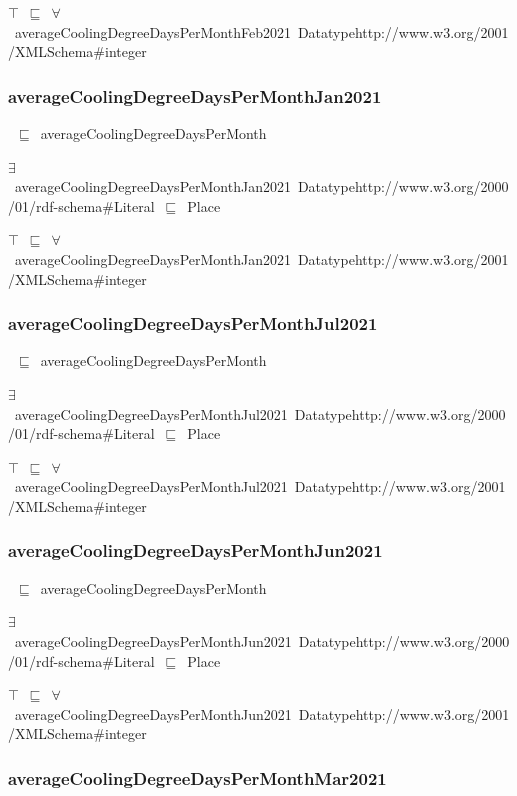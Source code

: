 \documentclass{article}
\begin{document}
\ensuremath{\top}~\ensuremath{\sqsubseteq}~\ensuremath{\forall}~averageCoolingDegreeDaysPerMonthFeb2021~Datatypehttp://www.w3.org/2001/XMLSchema#integer

\subsubsection*{averageCoolingDegreeDaysPerMonthJan2021}

~\ensuremath{\sqsubseteq}~averageCoolingDegreeDaysPerMonth

\ensuremath{\exists}~averageCoolingDegreeDaysPerMonthJan2021~Datatypehttp://www.w3.org/2000/01/rdf-schema#Literal~\ensuremath{\sqsubseteq}~Place

\ensuremath{\top}~\ensuremath{\sqsubseteq}~\ensuremath{\forall}~averageCoolingDegreeDaysPerMonthJan2021~Datatypehttp://www.w3.org/2001/XMLSchema#integer

\subsubsection*{averageCoolingDegreeDaysPerMonthJul2021}

~\ensuremath{\sqsubseteq}~averageCoolingDegreeDaysPerMonth

\ensuremath{\exists}~averageCoolingDegreeDaysPerMonthJul2021~Datatypehttp://www.w3.org/2000/01/rdf-schema#Literal~\ensuremath{\sqsubseteq}~Place

\ensuremath{\top}~\ensuremath{\sqsubseteq}~\ensuremath{\forall}~averageCoolingDegreeDaysPerMonthJul2021~Datatypehttp://www.w3.org/2001/XMLSchema#integer

\subsubsection*{averageCoolingDegreeDaysPerMonthJun2021}

~\ensuremath{\sqsubseteq}~averageCoolingDegreeDaysPerMonth

\ensuremath{\exists}~averageCoolingDegreeDaysPerMonthJun2021~Datatypehttp://www.w3.org/2000/01/rdf-schema#Literal~\ensuremath{\sqsubseteq}~Place

\ensuremath{\top}~\ensuremath{\sqsubseteq}~\ensuremath{\forall}~averageCoolingDegreeDaysPerMonthJun2021~Datatypehttp://www.w3.org/2001/XMLSchema#integer

\subsubsection*{averageCoolingDegreeDaysPerMonthMar2021}
\end{document}

